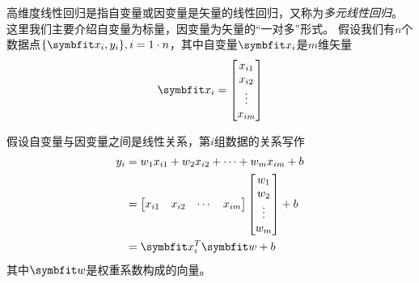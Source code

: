 高维度线性回归是指自变量或因变量是矢量的线性回归，又称为\emph{多元线性回归}。
这里我们主要介绍自变量为标量，因变量为矢量的“一对多”形式。
假设我们有$n$个数据点$\{\Vx_i,y_i\}, i=1\cdot n$，其中自变量$\Vx_i$是$m$维矢量
\begin{equation*}
    \Vx_i=
    \begin{bmatrix}
        x_{i1}\\
        x_{i2}\\
        \vdots\\
        x_{im}\\
    \end{bmatrix}
\end{equation*}

假设自变量与因变量之间是线性关系，第$i$组数据的关系写作
\begin{align}
    y_i &= w_1x_{i1}+w_2x_{i2}+\cdots+w_mx_{im}+b\nonumber\\
    &=\begin{bmatrix}
        x_{i1} & x_{i2} & \cdots & x_{im}
    \end{bmatrix}
    \begin{bmatrix}
        w_1\\
        w_2\\
        \vdots\\
        w_m
    \end{bmatrix}+b\nonumber\\
    &=\Vx_i^T\Vw+b
\end{align}
其中$\Vw$是权重系数构成的向量。

